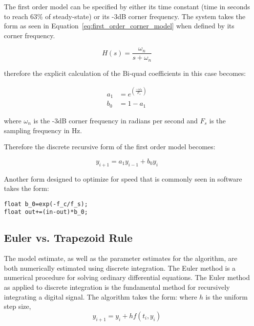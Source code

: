 The first order model can be specified by either its time constant (time in seconds to reach 63\% of steady-state) or its -3dB corner frequency.  The system takes the form as seen in Equation~\ref{eq:first_order_corner_model} when defined by its corner frequency.

\begin{equation}\label{eq:first_order_corner_model}
H(s)=\frac{\omega_n}{s+\omega_n}
\end{equation}

therefore the explicit calculation of the Bi-quad coefficients in this case becomes:

\begin{equation}\label{eq:first_order_coeffieicnts}
\begin{split}
 a_1&=e^{\left(\frac{-\omega_n}{F_s}\right)}  \\
 b_0&=1-a_1
\end{split}
\end{equation}

where $\omega_n$ is the -3dB corner frequency in radians per second and $F_s$ is the sampling frequency in Hz.

Therefore the discrete recursive form of the first order model becomes:

\begin{equation}
y_{i+1}=a_1y_{i-1}+b_0y_i
\end{equation}

Another form designed to optimize for speed that is commonly seen in software takes the form:

\begin{lstlisting}
float b_0=exp(-f_c/f_s);
float out+=(in-out)*b_0;
\end{lstlisting}

\subsection{Euler vs. Trapezoid Rule}

The model estimate, as well as the parameter estimates for the \Lone algorithm, are both numerically estimated using discrete integration.  The Euler method is a numerical procedure for solving ordinary differential equations. The Euler method as applied to discrete integration is the fundamental method for recursively integrating a digital signal.  The algorithm takes the form: \newline
where $h$ is the uniform step size,
\begin{equation}
y_{i+1}=y_i+hf(t_i,y_i)
\end{equation}


